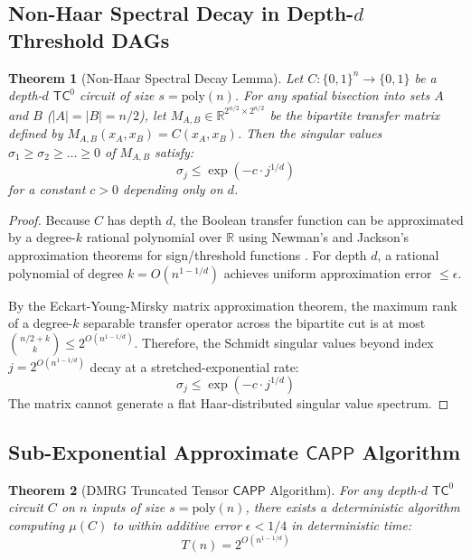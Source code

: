 \documentclass[11pt,letterpaper]{article}
\newtheorem{theorem}{Theorem}[section]
\newcommand{\TC}{\mathsf{TC}}
\newcommand{\CAPP}{\mathsf{CAPP}}
\newcommand{\poly}{\mathrm{poly}}
\newcommand{\R}{\mathbb{R}}
\newcommand{\eps}{\epsilon}
\begin{document}
\subsection{Non-Haar Spectral Decay in Depth-$d$ Threshold DAGs}

\begin{theorem}[Non-Haar Spectral Decay Lemma]
\label{thm:spectral_decay}
Let $C: \{0,1\}^n \to \{0,1\}$ be a depth-$d$ $\TC^0$ circuit of size $s = \poly(n)$. For any spatial bisection into sets $A$ and $B$ ($|A| = |B| = n/2$), let $M_{A,B} \in \R^{2^{n/2} \times 2^{n/2}}$ be the bipartite transfer matrix defined by $M_{A,B}(x_A, x_B) = C(x_A, x_B)$. Then the singular values $\sigma_1 \ge \sigma_2 \ge \dots \ge 0$ of $M_{A,B}$ satisfy:
\[
\sigma_j \le \exp\left(-c \cdot j^{1/d}\right)
\]
for a constant $c > 0$ depending only on $d$.
\end{theorem}

\begin{proof}
Because $C$ has depth $d$, the Boolean transfer function can be approximated by a degree-$k$ rational polynomial over $\R$ using Newman's and Jackson's approximation theorems for sign/threshold functions \cite{New64}. For depth $d$, a rational polynomial of degree $k = O(n^{1 - 1/d})$ achieves uniform approximation error $\le \eps$. 

By the Eckart-Young-Mirsky matrix approximation theorem, the maximum rank of a degree-$k$ separable transfer operator across the bipartite cut is at most $\binom{n/2 + k}{k} \le 2^{O(n^{1 - 1/d})}$. Therefore, the Schmidt singular values beyond index $j = 2^{O(n^{1 - 1/d})}$ decay at a stretched-exponential rate:
\[
\sigma_j \le \exp\left(-c \cdot j^{1/d}\right)
\]
The matrix cannot generate a flat Haar-distributed singular value spectrum.
\end{proof}

\subsection{Sub-Exponential Approximate $\CAPP$ Algorithm}

\begin{theorem}[DMRG Truncated Tensor $\CAPP$ Algorithm]
\label{thm:dmrg_capp}
For any depth-$d$ $\TC^0$ circuit $C$ on $n$ inputs of size $s = \poly(n)$, there exists a deterministic algorithm computing $\mu(C)$ to within additive error $\eps < 1/4$ in deterministic time:
\[
T(n) = 2^{O(n^{1 - 1/d})}
\]
\end{theorem}
\end{document}

